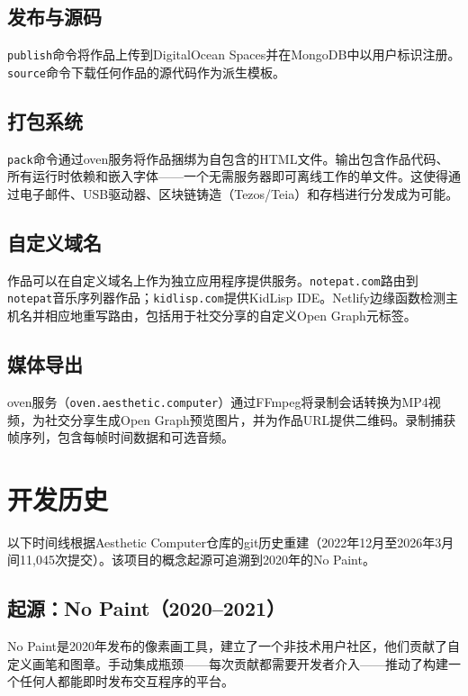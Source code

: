 \documentclass[10pt,letterpaper,twocolumn]{article}
\begin{document}
\subsection{发布与源码}

\texttt{publish}命令将作品上传到DigitalOcean Spaces并在MongoDB中以用户标识注册。\texttt{source}命令下载任何作品的源代码作为派生模板。

\subsection{打包系统}

\texttt{pack}命令通过oven服务将作品捆绑为自包含的HTML文件。输出包含作品代码、所有运行时依赖和嵌入字体——一个无需服务器即可离线工作的单文件。这使得通过电子邮件、USB驱动器、区块链铸造（Tezos/Teia）和存档进行分发成为可能。

\subsection{自定义域名}

作品可以在自定义域名上作为独立应用程序提供服务。\texttt{notepat.com}路由到\texttt{notepat}音乐序列器作品；\texttt{kidlisp.com}提供KidLisp IDE。Netlify边缘函数检测主机名并相应地重写路由，包括用于社交分享的自定义Open Graph元标签。

\subsection{媒体导出}

oven服务（\texttt{oven.aesthetic.computer}）通过FFmpeg将录制会话转换为MP4视频，为社交分享生成Open Graph预览图片，并为作品URL提供二维码。录制捕获帧序列，包含每帧时间数据和可选音频。


\section{开发历史}
\label{sec:history}

以下时间线根据Aesthetic Computer仓库的git历史重建（2022年12月至2026年3月间11,045次提交）。该项目的概念起源可追溯到2020年的No Paint。

\subsection{起源：No Paint（2020--2021）}

No Paint是2020年发布的像素画工具，建立了一个非技术用户社区，他们贡献了自定义画笔和图章。手动集成瓶颈——每次贡献都需要开发者介入——推动了构建一个任何人都能即时发布交互程序的平台。
\end{document}
